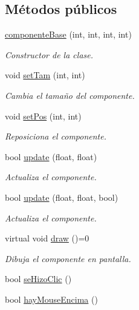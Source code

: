 \subsection*{Métodos públicos}
\begin{DoxyCompactItemize}
\item 
\hyperlink{classcomponente_base_a98286225e2be6f2080fe7d409e077a96}{componente\+Base} (int, int, int, int)
\begin{DoxyCompactList}\small\item\em Constructor de la clase. \end{DoxyCompactList}\item 
void \hyperlink{classcomponente_base_af9d40a15747b13d6cf6ac2b7b658a9d4}{set\+Tam} (int, int)
\begin{DoxyCompactList}\small\item\em Cambia el tamaño del componente. \end{DoxyCompactList}\item 
void \hyperlink{classcomponente_base_a3797a3ebadf03c8374d9c7a9460bc645}{set\+Pos} (int, int)
\begin{DoxyCompactList}\small\item\em Reposiciona el componente. \end{DoxyCompactList}\item 
bool \hyperlink{classcomponente_base_abb0253c1453914ecf1a2320cdddae474}{update} (float, float)
\begin{DoxyCompactList}\small\item\em Actualiza el componente. \end{DoxyCompactList}\item 
bool \hyperlink{classcomponente_base_ace60ea02ff300e2320657b25e54a1fe9}{update} (float, float, bool)
\begin{DoxyCompactList}\small\item\em Actualiza el componente. \end{DoxyCompactList}\item 
virtual void \hyperlink{classcomponente_base_ac6faec0698776f8bfe0e817b9927c0f9}{draw} ()=0
\begin{DoxyCompactList}\small\item\em Dibuja el componente en pantalla. \end{DoxyCompactList}\item 
bool \hyperlink{classcomponente_base_addd45a1c6418e3c4cb8eba0c50bf1668}{se\+Hizo\+Clic} ()
\item 
bool \hyperlink{classcomponente_base_adfb19d2ac7ce963167c614b3809e83fa}{hay\+Mouse\+Encima} ()
\end{DoxyCompactItemize}
